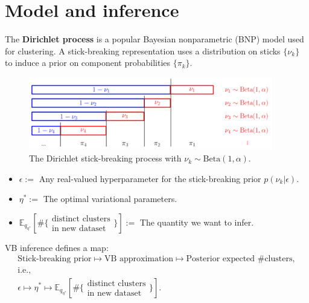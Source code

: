 \documentclass[a0,plainsections,30pt]{sciposter}\usepackage[]{graphicx}\usepackage[]{color}
\newcommand{\Expect}{\mathbb{E}}
\newcommand{\etaopt}{\eta^{*}}
\newcommand{\targetexpectation}{\Expect_{q_{\eta^*}}
\left[\#\{\substack{\text{distinct clusters}\\\text{in new dataset}}\} \right]}
\begin{document}
\begin{minipage}[t]{0.45\textwidth}
\section*{Model and inference }
\vspace{-0.3in}


The \textbf{Dirichlet process} is a popular Bayesian nonparametric
(BNP) model used for clustering.  A stick-breaking representation uses
a distribution on sticks $\{\nu_k\}$ to induce a prior on component
probabilities $\{\pi_k\}$.

\begin{figure}
\caption{The Dirichlet stick-breaking process with $\nu_k \sim \mathrm{Beta}(1, \alpha)$.}
\centering
\includegraphics[width = 0.95\textwidth]{./static_images/DP_stick_breaking.png}
\end{figure}
%
%
\begin{itemize}
\item $\epsilon :=$ Any real-valued hyperparameter for the stick-breaking prior
    $p(\nu_k | \epsilon)$.
\item $\etaopt :=$ The optimal variational parameters.
\item $\targetexpectation :=$ The quantity we want to infer.
\end{itemize}

\begin{mdframed}[style=MyFrame]
VB inference defines a map:
%
\begin{gather*}
\textrm{Stick-breaking prior}
    \mapsto \textrm{VB approximation}
    \mapsto \textrm{Posterior expected \# clusters},\\
\textrm{i.e.,}\\
\epsilon
    \mapsto \etaopt
    \mapsto \targetexpectation.
\end{gather*}
\end{mdframed}


\end{minipage}
\end{document}
